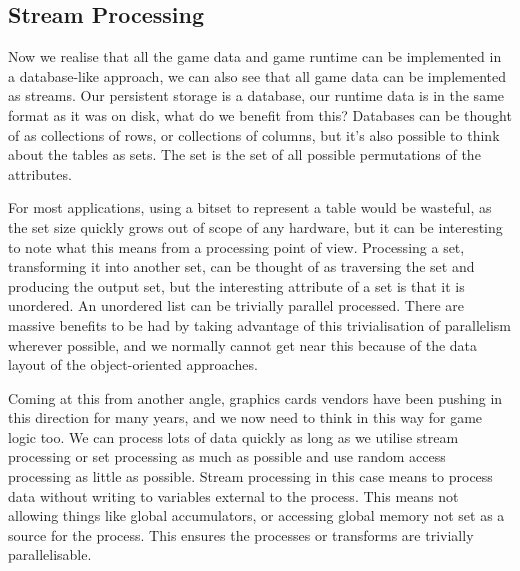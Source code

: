 \documentclass[a4paper,12pt]{book}
\begin{document}
\subsection{Stream Processing}

Now we realise that all the game data and game runtime can be implemented in a database-like approach, we can also see that all game data can be implemented as streams. Our persistent storage is a database, our runtime data is in the same format as it was on disk, what do we benefit from this? Databases can be thought of as collections of rows, or collections of columns, but it's also possible to think about the tables as sets. The set is the set of all possible permutations of the attributes.

For most applications, using a bitset to represent a table would be wasteful, as the set size quickly grows out of scope of any hardware, but it can be interesting to note what this means from a processing point of view. Processing a set, transforming it into another set, can be thought of as traversing the set and producing the output set, but the interesting attribute of a set is that it is unordered. An unordered list can be trivially parallel processed. There are massive benefits to be had by taking advantage of this trivialisation of parallelism wherever possible, and we normally cannot get near this because of the data layout of the object-oriented approaches.

Coming at this from another angle, graphics cards vendors have been pushing in this direction for many years, and we now need to think in this way for game logic too. We can process lots of data quickly as long as we utilise stream processing or set processing as much as possible and use random access processing as little as possible. Stream processing in this case means to process data without writing to variables external to the process. This means not allowing things like global accumulators, or accessing global memory not set as a source for the process. This ensures the processes or transforms are trivially parallelisable.
\end{document}
